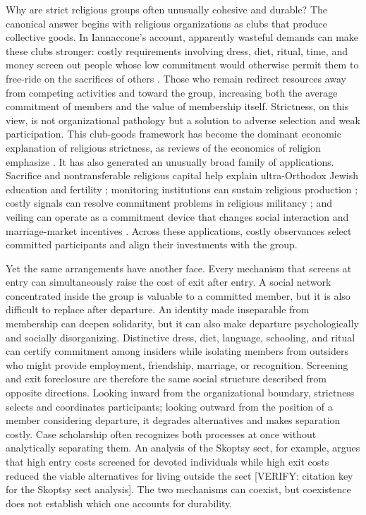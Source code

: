 \documentclass[12pt]{article}
\begin{document}
Why are strict religious groups often unusually cohesive and durable? The canonical answer begins with religious organizations as clubs that produce collective goods. In Iannaccone's account, apparently wasteful demands can make these clubs stronger: costly requirements involving dress, diet, ritual, time, and money screen out people whose low commitment would otherwise permit them to free-ride on the sacrifices of others \citep{iannaccone1988,iannaccone1992,iannaccone1994}. Those who remain redirect resources away from competing activities and toward the group, increasing both the average commitment of members and the value of membership itself. Strictness, on this view, is not organizational pathology but a solution to adverse selection and weak participation. This club-goods framework has become the dominant economic explanation of religious strictness, as reviews of the economics of religion emphasize \citep{iyer2016,carvalho2019}. It has also generated an unusually broad family of applications. Sacrifice and nontransferable religious capital help explain ultra-Orthodox Jewish education and fertility \citep{berman2000}; monitoring institutions can sustain religious production \citep{mcbride2007}; costly signals can resolve commitment problems in religious militancy \citep{bermanlaitin2008}; and veiling can operate as a commitment device that changes social interaction and marriage-market incentives \citep{carvalho2013}. Across these applications, costly observances select committed participants and align their investments with the group.

Yet the same arrangements have another face. Every mechanism that screens at entry can simultaneously raise the cost of exit after entry. A social network concentrated inside the group is valuable to a committed member, but it is also difficult to replace after departure. An identity made inseparable from membership can deepen solidarity, but it can also make departure psychologically and socially disorganizing. Distinctive dress, diet, language, schooling, and ritual can certify commitment among insiders while isolating members from outsiders who might provide employment, friendship, marriage, or recognition. Screening and exit foreclosure are therefore the same social structure described from opposite directions. Looking inward from the organizational boundary, strictness selects and coordinates participants; looking outward from the position of a member considering departure, it degrades alternatives and makes separation costly. Case scholarship often recognizes both processes at once without analytically separating them. An analysis of the Skoptsy sect, for example, argues that high entry costs screened for devoted individuals while high exit costs reduced the viable alternatives for living outside the sect [VERIFY: citation key for the Skoptsy sect analysis]. The two mechanisms can coexist, but coexistence does not establish which one accounts for durability.
\end{document}
